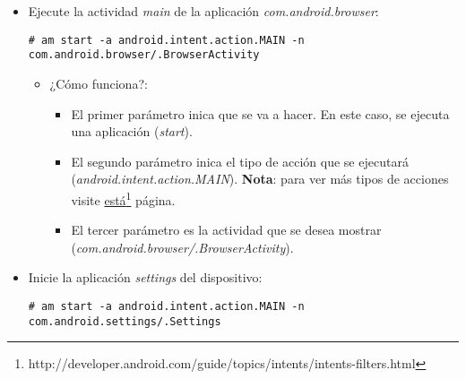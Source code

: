 \begin{itemize}
    \item Ejecute la actividad \textit{main} de la aplicación \emph{com.android.browser}:
    \begin{lstlisting}
# am start -a android.intent.action.MAIN -n com.android.browser/.BrowserActivity
    \end{lstlisting}
    \begin{itemize}
	\item ¿Cómo funciona?:
	\begin{itemize}
	    \item El primer parámetro inica que se va a hacer. En este caso, se ejecuta una aplicación (\emph{start}).
	    
	    \item El segundo parámetro inica el tipo de acción que se ejecutará (\emph{android.intent.action.MAIN}). \textbf{Nota}: para ver más tipos de acciones visite \href{http://developer.android.com/guide/topics/intents/intents-filters.html}{está}\footnote{http://developer.android.com/guide/topics/intents/intents-filters.html} página.
	    
	    \item El tercer parámetro es la actividad que se desea mostrar (\emph{com.android.browser/.BrowserActivity}).
	\end{itemize}
    \end{itemize}

    \item Inicie la aplicación \emph{settings} del dispositivo:
    \begin{lstlisting}
# am start -a android.intent.action.MAIN -n com.android.settings/.Settings
    \end{lstlisting}    
\end{itemize}
